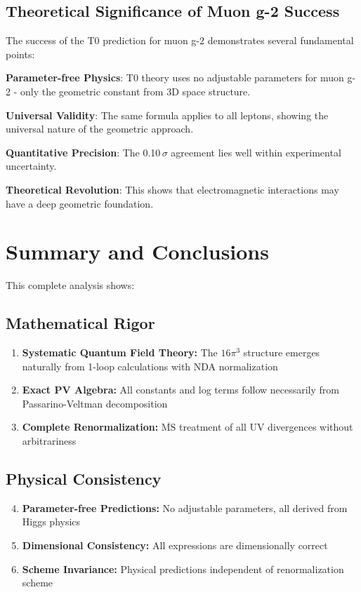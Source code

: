\documentclass[12pt,a4paper]{article}
\theoremstyle{definition}
\begin{document}
	\subsection{Theoretical Significance of Muon g-2 Success}
	
	The success of the T0 prediction for muon g-2 demonstrates several fundamental points:
	
	\begin{important}
		\textbf{Parameter-free Physics}: T0 theory uses no adjustable parameters for muon g-2 - only the geometric constant from 3D space structure.
		
		\textbf{Universal Validity}: The same formula applies to all leptons, showing the universal nature of the geometric approach.
		
		\textbf{Quantitative Precision}: The 0.10$\,\sigma$ agreement lies well within experimental uncertainty.
		
		\textbf{Theoretical Revolution}: This shows that electromagnetic interactions may have a deep geometric foundation.
	\end{important}
	
	\section{Summary and Conclusions}
	
	This complete analysis shows:
	
	\subsection{Mathematical Rigor}
	\begin{enumerate}
		\item \textbf{Systematic Quantum Field Theory:} The $16\pi^3$ structure emerges naturally from 1-loop calculations with NDA normalization
		\item \textbf{Exact PV Algebra:} All constants and log terms follow necessarily from Passarino-Veltman decomposition
		\item \textbf{Complete Renormalization:} $\overline{\text{MS}}$ treatment of all UV divergences without arbitrariness
	\end{enumerate}
	
	\subsection{Physical Consistency}
	\begin{enumerate}
		\setcounter{enumi}{3}
		\item \textbf{Parameter-free Predictions:} No adjustable parameters, all derived from Higgs physics
		\item \textbf{Dimensional Consistency:} All expressions are dimensionally correct
		\item \textbf{Scheme Invariance:} Physical predictions independent of renormalization scheme
	\end{enumerate}
	
\end{document}
